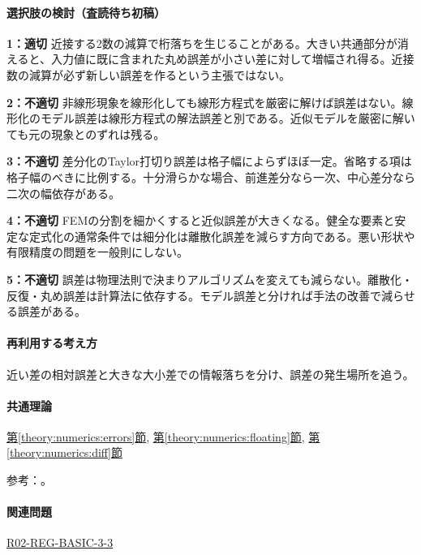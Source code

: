 \paragraph{選択肢の検討（査読待ち初稿）}\mbox{}\par

\noindent\textbf{1：適切} 近接する2数の減算で桁落ちを生じることがある。大きい共通部分が消えると、入力値に既に含まれた丸め誤差が小さい差に対して増幅され得る。近接数の減算が必ず新しい誤差を作るという主張ではない。\par

\noindent\textbf{2：不適切} 非線形現象を線形化しても線形方程式を厳密に解けば誤差はない。線形化のモデル誤差は線形方程式の解法誤差と別である。近似モデルを厳密に解いても元の現象とのずれは残る。\par

\noindent\textbf{3：不適切} 差分化のTaylor打切り誤差は格子幅によらずほぼ一定。省略する項は格子幅のべきに比例する。十分滑らかな場合、前進差分なら一次、中心差分なら二次の幅依存がある。\par

\noindent\textbf{4：不適切} FEMの分割を細かくすると近似誤差が大きくなる。健全な要素と安定な定式化の通常条件では細分化は離散化誤差を減らす方向である。悪い形状や有限精度の問題を一般則にしない。\par

\noindent\textbf{5：不適切} 誤差は物理法則で決まりアルゴリズムを変えても減らない。離散化・反復・丸め誤差は計算法に依存する。モデル誤差と分ければ手法の改善で減らせる誤差がある。\par

\paragraph{再利用する考え方} 近い差の相対誤差と大きな大小差での情報落ちを分け、誤差の発生場所を追う。

\paragraph{共通理論} \hyperref[theory:numerics:errors]{第\ref*{theory:numerics:errors}節}, \hyperref[theory:numerics:floating]{第\ref*{theory:numerics:floating}節}, \hyperref[theory:numerics:diff]{第\ref*{theory:numerics:diff}節}

\par 参考：\cite{goldberg1991,nist_differentiation,mit_roy_fea1999}。

\paragraph{関連問題} \hyperref[q:r02-reg-basic-3-3]{R02-REG-BASIC-3-3}

